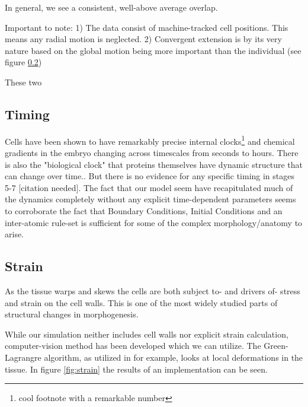 In general, we see a consistent, well-above average overlap. 


Important to note:
1) The data consist of machine-tracked cell positions. This means any radial motion is neglected.
2) Convergent extension is by its very nature based on the global motion being more important than the individual (see figure \ref{}) 

These two 



\subsection{Timing}
Cells have been shown to have remarkably precise internal clocks\footnote{cool footnote with a remarkable number\cite{cellinternal}} and chemical gradients in the embryo changing across timescales from seconds to hours\cite{shvartsman2008dynamics}. There is also the "biological clock"\cite{johanolsen2} that proteins themselves have dynamic structure that can change over time.\cite{johanolsen1}. But there is no evidence for any specific timing in stages 5-7 [citation needed]. The fact that our model seem have recapitulated much of the dynamics completely without any explicit time-dependent parameters seems to corroborate the fact that Boundary Conditions, Initial Conditions and an inter-atomic rule-set is sufficient for some of the complex morphology/anatomy to arise. 


\subsection{Strain}
As the tissue warps and skews the cells are both subject to- and drivers of- stress and strain on the cell walls. This is one of the most widely studied parts of structural changes in morphogenesis.

While our simulation neither includes cell walls nor explicit strain calculation, computer-vision method has been developed which we can utilize. The Green-Lagrangre algorithm, as utilized in \cite{butler2009cell} for example, looks at local deformations in the tissue. In figure \ref{fig:strain} the results of an implementation can be seen.

